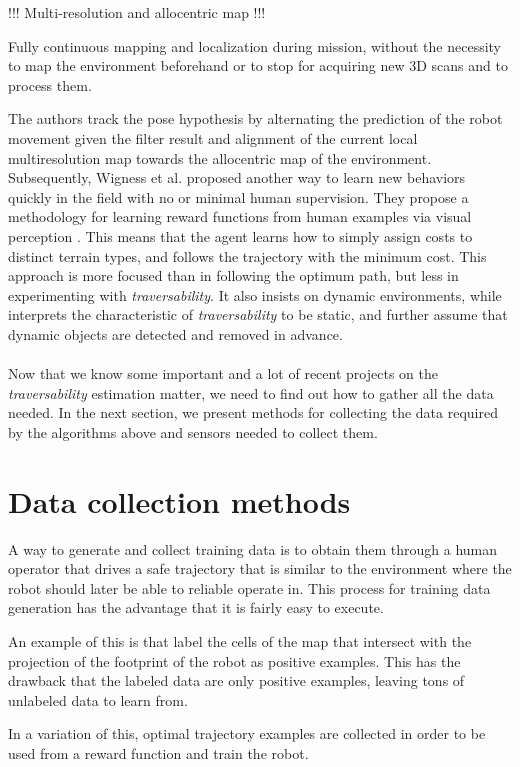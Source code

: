 \documentclass[12pt,a4paper]{report}
\newcommand{\term}{\textit}
\begin{document}
	!!! Multi-resolution and allocentric map !!!
	
	Fully continuous mapping and
	localization during mission, without the necessity to map the environment beforehand
	or to stop for acquiring new 3D scans and to process them.
	
	The authors track the pose hypothesis by alternating the prediction of the robot 
	movement given the filter result and alignment of the current local multiresolution 
	map towards the allocentric map of the environment.
	\\
	
	Subsequently, Wigness et al. proposed another way to learn new behaviors quickly 
	in the field with no or minimal human supervision. They propose a methodology 
	for learning reward functions from human examples via visual perception 
	\cite{Wigness}. This means that the agent learns how to simply assign costs to 
	distinct terrain types, and follows the trajectory with the minimum cost. This 
	approach is more focused than \cite{Suger} in following the optimum path, but 
	less in experimenting with \term{traversability}. It also insists on dynamic 
	environments, while \cite{Suger} interprets the characteristic of 
	\term{traversability} to be static, and further assume that dynamic objects are 
	detected and removed in advance.
	\\\\
	
	
	Now that we know some important and a lot of recent projects on the 
	\term{traversability} estimation matter, we need to find out how to gather all 
	the data needed. In the next section, we present methods for collecting the data 
	required by the algorithms above and sensors needed to collect them.
	\\
	
	\section{Data collection methods}
	\label{sec:bg:data}
	
	A way to generate and collect training data is to obtain them through a human 
	operator that drives a safe trajectory that is similar to the environment where 
	the robot should later be able to reliable operate in. This process for training 
	data generation has the advantage that it is fairly easy to execute.
	\par 
	An example of this is \cite{Suger} that label the cells of the map that 
	intersect with the projection of the footprint of the robot as positive examples. 
	This has the drawback that the labeled data are only positive examples, leaving 
	tons of unlabeled data to learn from.
	\par 
	In a variation of this, optimal trajectory examples are collected \cite{Wigness} 
	in order to be used from a reward function and train the robot.
	\\
	
\end{document}
